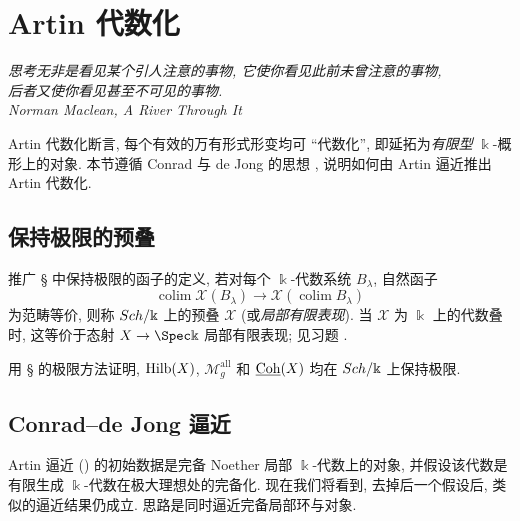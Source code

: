 \section{Artin 代数化}\label{src:C.6}
\begin{flushright}\itshape
思考无非是看见某个引人注意的事物, 它使你看见此前未曾注意的事物,\\
后者又使你看见甚至不可见的事物.\\
\normalfont Norman Maclean, \textit{A River Through It}
\end{flushright}
Artin 代数化断言, 每个有效的万有形式形变均可 ``代数化'', 即延拓为\textit{有限型} $\Bbbk$-概形上的对象. 本节遵循 Conrad 与 de Jong 的思想 \cite{CdJ02}, 说明如何由 Artin 逼近推出 Artin 代数化.
\subsection{保持极限的预叠}\label{src:C.6.1-subsection}
推广 \S{} 中保持极限的函子的定义, 若对每个 $\Bbbk$-代数系统 $B_\lambda$, 自然函子
\[
\operatorname{colim}\mathcal X(B_\lambda)\to\mathcal X(\operatorname{colim}B_\lambda)
\]
为范畴等价, 则称 $Sch/\Bbbk$ 上的预叠 $\mathcal X$  (或\textit{局部有限表现}). 当 $\mathcal X$ 为 $\Bbbk$ 上的代数叠时, 这等价于态射 $\mathcal X\to\Spec\Bbbk$ 局部有限表现; 见习题 .
\begin{exercise}\label{src:C.6.1}
用 \S{} 的极限方法证明, $\operatorname{Hilb}(X)$, $\mathcal M_g^{\mathrm{all}}$ 和 $\underline{\mathrm{Coh}}(X)$ 均在 $Sch/\Bbbk$ 上保持极限.
\end{exercise}
\subsection{Conrad--de Jong 逼近}\label{src:C.6.2-subsection}
Artin 逼近 () 的初始数据是完备 Noether 局部 $\Bbbk$-代数上的对象, 并假设该代数是有限生成 $\Bbbk$-代数在极大理想处的完备化. 现在我们将看到, 去掉后一个假设后, 类似的逼近结果仍成立. 思路是同时逼近完备局部环与对象.

